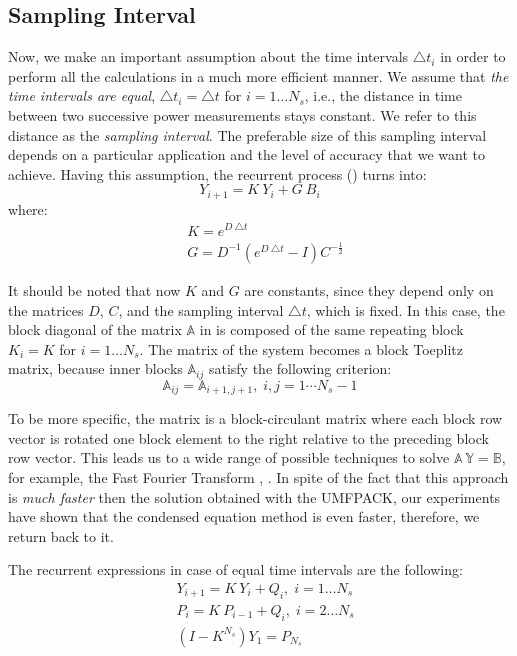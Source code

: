 \subsection{Sampling Interval}
Now, we make an important assumption about the time intervals $\triangle t_i$ in order to perform all the calculations in a much more efficient manner. We assume that \emph{the time intervals are equal}, $\triangle t_i = \triangle t$ for $i = 1 \dots N_s$, i.e., the distance in time between two successive power measurements stays constant. We refer to this distance as the \emph{sampling interval}. The preferable size of this sampling interval depends on a particular application and the level of accuracy that we want to achieve. Having this assumption, the recurrent process () turns into:
\[
  Y_{i+1} = K \: Y_i + G \: B_i
\]
where:
\begin{align*}
  & K = e^{D \: \triangle t} \\
  & G = D^{-1} \left( e^{D \: \triangle t} - I \right) C^{-\frac{1}{2}}
\end{align*}

It should be noted that now $K$ and $G$ are constants, since they depend only on the matrices $D$, $C$, and the sampling interval $\triangle t$, which is fixed. In this case, the block diagonal of the matrix $\mathbb{A}$ in  is composed of the same repeating block $K_i = K$ for $i = 1 \dots N_s$. The matrix of the system becomes a block Toeplitz matrix, because inner blocks $\mathbb{A}_{ij}$ satisfy the following criterion:
\[
  \mathbb{A}_{ij} = \mathbb{A}_{i+1, j+1}, \; i, j = 1 \cdots N_s - 1
\]

To be more specific, the matrix is a block-circulant matrix where each block row vector is rotated one block element to the right relative to the preceding block row vector. This leads us to a wide range of possible techniques to solve \mbox{$\mathbb{A} \: \mathbb{Y} = \mathbb{B}$}, for example, the Fast Fourier Transform \cite{mazancourt1983}, \cite{vescovo1997}. In spite of the fact that this approach is \emph{much faster} then the solution obtained with the UMFPACK, our experiments have shown that the condensed equation method is even faster, therefore, we return back to it.

The recurrent expressions in case of equal time intervals are the following:
\begin{align}
  & Y_{i + 1} = K \: Y_i + Q_i, \; i = 1 \dots N_s \nonumber \\
  & P_i = K \: P_{i - 1} + Q_i, \; i = 2 \dots N_s \nonumber \\
  & (I - K^{N_s}) Y_1 = P_{N_s} \label{eq:linear-system}
\end{align}

